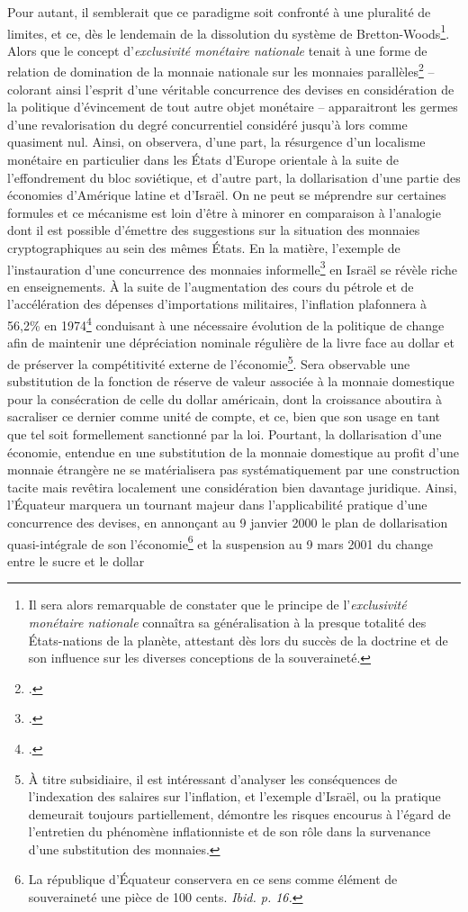 {Pour autant, il semblerait que ce paradigme soit confronté à une pluralité de limites, et ce, dès le lendemain de la dissolution du système de Bretton-Woods\footnote{Il sera alors remarquable de constater que le principe de l'\emph{exclusivité monétaire nationale} connaîtra sa généralisation à la presque totalité des États-nations de la planète, attestant dès lors du succès de la doctrine et de son influence sur les diverses conceptions de la souveraineté.}. Alors que le concept d'\emph{exclusivité monétaire nationale} tenait à une forme de relation de domination de la monnaie nationale sur les monnaies parallèles\footnote{.} \---{} colorant ainsi l'esprit d'une véritable concurrence des devises en considération de la politique d'évincement de tout autre objet monétaire \---{} apparaitront les germes d'une revalorisation du degré concurrentiel considéré jusqu'à lors comme quasiment nul. Ainsi, on observera, d'une part, la résurgence d'un localisme monétaire en particulier dans les États d'Europe orientale à la suite de l'effondrement du bloc soviétique, et d'autre part, la dollarisation d'une partie des économies d'Amérique latine et d'Israël. On ne peut se méprendre sur certaines formules et ce mécanisme est loin d'être à minorer en comparaison à l'analogie dont il est possible d'émettre des suggestions sur la situation des monnaies cryptographiques au sein des mêmes États. En la matière, l'exemple de l'instauration d'une concurrence des monnaies informelle\footnote{.} en Israël se révèle riche en enseignements. À la suite de l'augmentation des cours du pétrole et de l'accélération des dépenses d'importations militaires, l'inflation plafonnera à 56,2\% en 1974\footnote{.} conduisant à une nécessaire évolution de la politique de change afin de maintenir une dépréciation nominale régulière de la livre face au dollar et de préserver la compétitivité externe de l'économie\footnote{À titre subsidiaire, il est intéressant d'analyser les conséquences de l'indexation des salaires sur l'inflation, et l'exemple d'Israël, ou la pratique demeurait toujours partiellement, démontre les risques encourus à l'égard de l'entretien du phénomène inflationniste et de son rôle dans la survenance d'une substitution des monnaies.}. Sera observable une substitution de la fonction de réserve de valeur associée à la monnaie domestique pour la consécration de celle du dollar américain, dont la croissance aboutira à sacraliser ce dernier comme unité de compte, et ce, bien que son usage en tant que tel soit formellement sanctionné par la loi. Pourtant, la dollarisation d'une économie, entendue en une substitution de la monnaie domestique au profit d'une monnaie étrangère ne se matérialisera pas systématiquement par une construction tacite mais revêtira localement une considération bien davantage juridique. Ainsi, l'Équateur marquera un tournant majeur dans l'applicabilité pratique d'une concurrence des devises, en annonçant au 9 janvier 2000 le plan de dollarisation quasi-intégrale de son l'économie\footnote{La république d'Équateur conservera en ce sens comme élément de souveraineté une pièce de 100 cents. \emph{Ibid. p. 16.}} et la suspension au 9 mars 2001 du change entre le sucre et le dollar }
